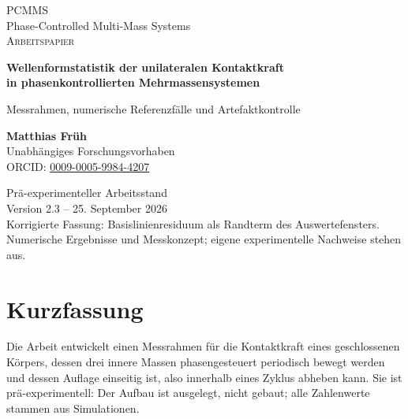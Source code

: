 \documentclass[12pt,a4paper]{report}
\begin{document}
\begin{titlepage}
\thispagestyle{empty}
\centering
\vspace*{1.2cm}
{\Large\textsc{PCMMS}}\\[0.3cm]
{\large Phase-Controlled Multi-Mass Systems}\\[1.5cm]
{\Large\textsc{Arbeitspapier}}\\[1.0cm]
{\LARGE\bfseries
Wellenformstatistik der unilateralen Kontaktkraft\\[0.3cm]
in phasenkontrollierten Mehrmassensystemen
\par}
\vspace{0.8cm}
{\large Messrahmen, numerische Referenzfälle und Artefaktkontrolle\par}
\vspace{1.5cm}
{\Large\textbf{Matthias Früh}}\\[0.4cm]
{\normalsize Unabhängiges Forschungsvorhaben}\\[0.3cm]
{\normalsize ORCID: \href{https://orcid.org/0009-0005-9984-4207}{0009-0005-9984-4207}}
\vfill
\begin{minipage}{0.9\textwidth}
\centering
Prä-experimenteller Arbeitsstand\\[0.3cm]
Version 2.3 -- 25. September 2026\\[0.6cm]
\small
Korrigierte Fassung: Basislinienresiduum als Randterm des Auswertefensters.\\
Numerische Ergebnisse und Messkonzept; eigene experimentelle Nachweise stehen aus.
\end{minipage}
\vspace*{0.7cm}
\end{titlepage}

\tableofcontents
\clearpage

\chapter*{Kurzfassung}

Die Arbeit entwickelt einen Messrahmen für die Kontaktkraft eines
geschlossenen Körpers, dessen drei innere Massen phasengesteuert
periodisch bewegt werden und dessen Auflage einseitig ist, also innerhalb
eines Zyklus abheben kann. Sie ist prä-experimentell: Der Aufbau ist
ausgelegt, nicht gebaut; alle Zahlenwerte stammen aus Simulationen.
\end{document}
